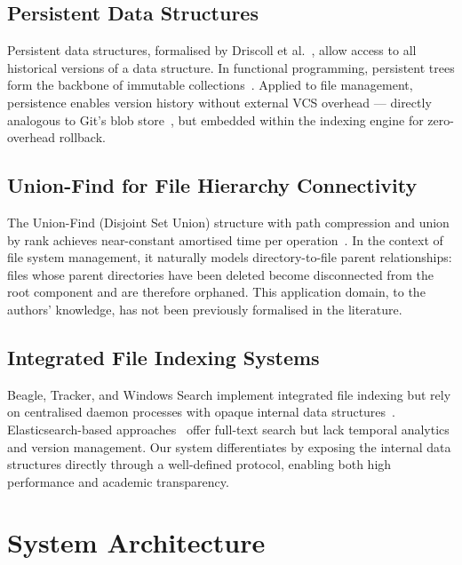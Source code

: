 \documentclass[conference]{IEEEtran}
\begin{document}
\subsection{Persistent Data Structures}

Persistent data structures, formalised by Driscoll et al.~\cite{driscoll1989making}, allow access to all historical versions of a data structure. In functional programming, persistent trees form the backbone of immutable collections~\cite{okasaki1998purely}. Applied to file management, persistence enables version history without external VCS overhead — directly analogous to Git's blob store~\cite{chacon2014pro}, but embedded within the indexing engine for zero-overhead rollback.

\subsection{Union-Find for File Hierarchy Connectivity}

The Union-Find (Disjoint Set Union) structure with path compression and union by rank achieves near-constant amortised time per operation~\cite{tarjan1984worst}. In the context of file system management, it naturally models directory-to-file parent relationships: files whose parent directories have been deleted become disconnected from the root component and are therefore orphaned. This application domain, to the authors' knowledge, has not been previously formalised in the literature.

\subsection{Integrated File Indexing Systems}

Beagle, Tracker, and Windows Search implement integrated file indexing but rely on centralised daemon processes with opaque internal data structures~\cite{mckay2004desktop}. Elasticsearch-based approaches~\cite{divya2013elasticsearch} offer full-text search but lack temporal analytics and version management. Our system differentiates by exposing the internal data structures directly through a well-defined protocol, enabling both high performance and academic transparency.

\section{System Architecture}
\label{sec:arch}
\end{document}
